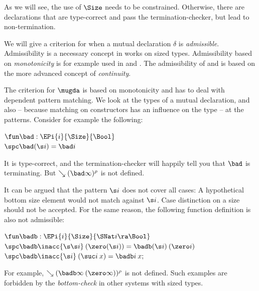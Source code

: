 As we will see, the use of $\Size$ needs to be constrained.
Otherwise, there are declarations that are type-correct and pass the termination-checker, but lead to non-termination.

We will give a criterion for when a mutual declaration $\delta$ is \emph{admissible}.
Admissibility is a necessary concept in works on sized types.
Admissibility based on \emph{monotonicity} is for example used in \cite{bgp:lpar06} and \cite{blanqui04typebased}.
The admissibility of \cite{abel:PhD} and \cite{hughes96proving} is based on the more advanced concept of \emph{continuity}.

The criterion for $\mugda$ is based on monotonicity and has to deal with dependent pattern matching. 
We look at the types of a mutual declaration, and also -- because matching on constructors has an influence on the type -- at the patterns. Consider for example the following:
\begin{bsp}
$\fun \bad : \EPi{i}{\Size}{\Bool}$\\
$\spc \bad (\s i) = \bad i $ 
\end{bsp}
It is type-correct, and the termination-checker will happily tell you that $\bad$ is terminating.
But $\wh \clp{\bad \infty}{\rho}$ is not defined.

It can be argued that the pattern $\s i$ does not cover all cases: A hypothetical bottom size element would not match against $\s i$. Case distinction on a size should not be accepted.
For the same reason, the following function definition is also not admissible:
\begin{bsp}
$\fun \badb : \EPi{i}{\Size}{\SNat i \ra \Bool}$\\
$\spc \badb \inacc{\s \s i} \: (\zero (\s i)) = \badb (\s i) \: (\zero i)$\\
$\spc \badb \inacc{\s i}\: (\suc i \: x) = \badb i \: x;$
\end{bsp}
For example, $\wh \clp{\badb \infty \: (\zero \infty)}{\rho}$ is not defined.
Such examples are forbidden by the \emph{bottom-check} \cite{hughes96proving} in other systems with sized types.

